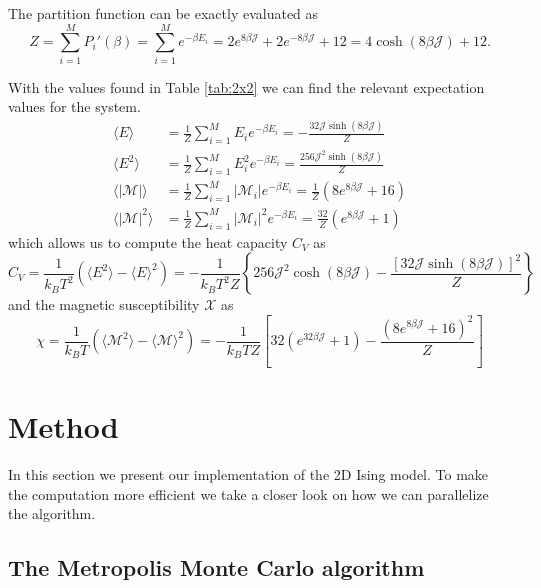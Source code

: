 \documentclass[a4paper]{article}
\begin{document}
The partition function can be exactly evaluated as
\begin{equation}
	Z=\sum_{i=1}^MP_i'(\beta)=\sum_{i=1}^Me^{-\beta E_i}=2e^{8\beta\mathcal{J}}+2e^{-8\beta\mathcal{J}}+12=4\cosh(8\beta\mathcal{J})+12. \label{eq:Z_2x2}
\end{equation}


With the values found in Table \ref{tab:2x2} we can find the relevant expectation values for the system.
\begin{align}
	\langle E \rangle&=\frac{1}{Z}\sum_{i=1}^ME_ie^{-\beta E_i}=-\frac{32\mathcal{J}\sinh(8\beta\mathcal{J})}{Z} \label{eq:E_2x2_avg}\\[0.20cm]
	\langle E^2 \rangle&=\frac{1}{Z}\sum_{i=1}^ME_i^2e^{-\beta E_i}=\frac{256\mathcal{J}^2\sinh(8\beta\mathcal{J})}{Z} \label{eq:E2_2x2_avg}\\[0.20cm]
	\langle |\mathcal{M}| \rangle&=\frac{1}{Z}\sum_{i=1}^M|\mathcal{M}_i|e^{-\beta E_i}=\frac{1}{Z}(8e^{8\beta\mathcal{J}}+16) \label{eq:M_2x2_avg}\\[0.20cm]
	\langle |\mathcal{M}|^2 \rangle&=\frac{1}{Z}\sum_{i=1}^M|\mathcal{M}_i|^2e^{-\beta E_i}=\frac{32}{Z}(e^{8\beta\mathcal{J}}+1) \label{eq:M2_2x2_avg}
\end{align}
which allows us to compute the heat capacity $C_V$ as
\begin{equation}
	C_V=\frac{1}{k_BT^2}\left(\langle E^2 \rangle-\langle E \rangle^2\right)=-\frac{1}{k_BT^2Z}\left\{256\mathcal{J}^2\cosh(8\beta\mathcal{J})-\frac{\left[32\mathcal{J}\sinh(8\beta\mathcal{J})\right]^2}{Z}\right\} \label{eq:Cv_2x2}
\end{equation}
and the magnetic susceptibility $\mathcal{X}$ as
\begin{equation}
	\chi=\frac{1}{k_BT}\left(\langle \mathcal{M}^2 \rangle-\langle \mathcal{M} \rangle^2\right)=-\frac{1}{k_BTZ}\left[32(e^{32\beta\mathcal{J}}+1)-\frac{(8e^{8\beta\mathcal{J}}+16)^2}{Z}\right] \label{eq:X_2x2}
\end{equation}





\section{Method}
\color{black}
In this section we present our implementation of the 2D Ising model. To make the computation more efficient we take a closer look on how we can parallelize the algorithm. 

\subsection{The Metropolis Monte Carlo algorithm}
\end{document}
